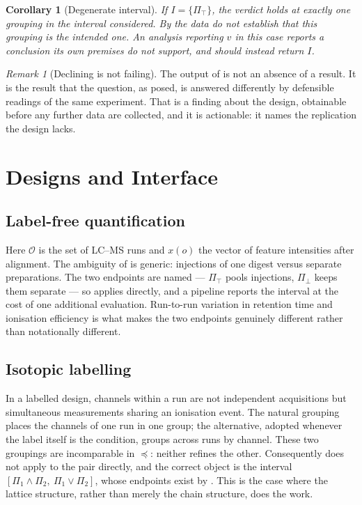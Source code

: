 \documentclass[11pt,a4paper]{article}
\newtheorem{corollary}[theorem]{Corollary}
\theoremstyle{definition}
\theoremstyle{remark}
\newtheorem{remark}[theorem]{Remark}
\newcommand{\Obs}{\mathcal{O}}               %
\newcommand{\Part}{\Pi}                      %
\begin{document}
\begin{corollary}[Degenerate interval]\label{cor:degenerate}
If $I = \{\Part_{\top}\}$, the verdict holds at exactly one grouping in
the interval considered. By  the data do not
establish that this grouping is the intended one. An analysis reporting
$v$ in this case reports a conclusion its own premises do not support,
and should instead return $I$.
\end{corollary}

\begin{remark}[Declining is not failing]\label{rem:decline-not-fail}
The output of  is not an absence of a result. It is
the result that the question, as posed, is answered differently by
defensible readings of the same experiment. That is a finding about the
design, obtainable before any further data are collected, and it is
actionable: it names the replication the design lacks.
\end{remark}

\section{Designs and Interface}
\label{sec:practice}

\subsection{Label-free quantification}

Here $\Obs$ is the set of LC--MS runs and $x(o)$ the vector of feature
intensities after alignment. The ambiguity of  is
generic: injections of one digest versus separate preparations. The two
endpoints are named --- $\Part_{\top}$ pools injections, $\Part_{\bot}$
keeps them separate --- so  applies directly, and a
pipeline reports the interval at the cost of one additional evaluation.
Run-to-run variation in retention time and ionisation efficiency
\citep{krokhin2006sequence,michalski2011more} is what makes the two
endpoints genuinely different rather than notationally different.

\subsection{Isotopic labelling}

In a labelled design, channels within a run are not independent
acquisitions but simultaneous measurements sharing an ionisation event.
The natural grouping places the channels of one run in one group; the
alternative, adopted whenever the label itself is the condition, groups
across runs by channel. These two groupings are incomparable in
$\preceq$: neither refines the other. Consequently 
does not apply to the pair directly, and the correct object is the
interval $[\Part_1 \wedge \Part_2,\ \Part_1 \vee \Part_2]$, whose
endpoints exist by . This is the case where the
lattice structure, rather than merely the chain structure, does the work.
\end{document}
